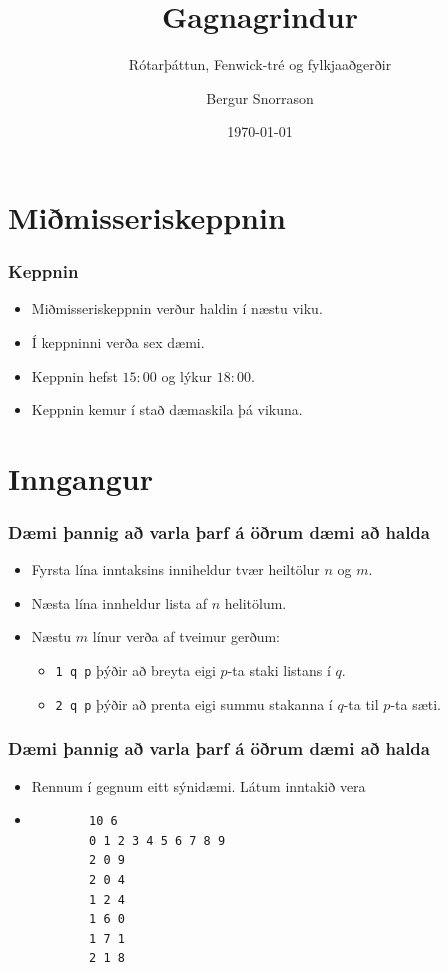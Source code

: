 \documentclass{beamer}
\title{Gagnagrindur}
\subtitle{Rótarþáttun, Fenwick-tré og fylkjaaðgerðir}
\author{Bergur Snorrason}
\date{\today}
\begin{document}
\frame{\titlepage}

\section[Miðmisseriskeppnin]{Miðmisseriskeppnin}

\begin{frame}
	\frametitle{Keppnin}
\begin{itemize}
	\item<1-> Miðmisseriskeppnin verður haldin í næstu viku.
	\item<2-> Í keppninni verða sex dæmi.
	\item<3-> Keppnin hefst $15:00$ og lýkur $18:00$.
	\item<4-> Keppnin kemur í stað dæmaskila þá vikuna.
\end{itemize}
\end{frame}

\section[Inngangur]{Inngangur}

\begin{frame}
	\frametitle{Dæmi þannig að varla þarf á öðrum dæmi að halda}
\begin{itemize}
	\item<1-> Fyrsta lína inntaksins inniheldur tvær heiltölur $n$ og $m$.
	\item<2-> Næsta lína innheldur lista af $n$ helitölum.
	\item<3-> Næstu $m$ línur verða af tveimur gerðum:
		\begin{itemize}
			\item<4-> \texttt{1 q p} þýðir að breyta eigi $p$-ta staki listans í $q$.
			\item<5-> \texttt{2 q p} þýðir að prenta eigi summu stakanna í $q$-ta til $p$-ta sæti.
		\end{itemize}
\end{itemize}
\end{frame}

\begin{frame}[fragile]
	\frametitle{Dæmi þannig að varla þarf á öðrum dæmi að halda}
\begin{itemize}
	\item<1-> Rennum í gegnum eitt sýnidæmi. Látum inntakið vera
		\item<2->\begin{verbatim}
		10 6
		0 1 2 3 4 5 6 7 8 9
		2 0 9
		2 0 4
		1 2 4
		1 6 0
		1 7 1
		2 1 8
		\end{verbatim}
\end{itemize}
\end{frame}
\end{document}
